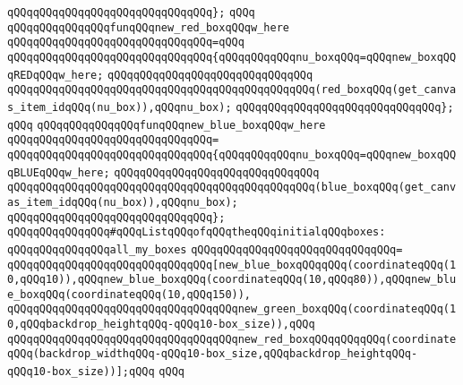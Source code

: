 \verb|qQQqqQQqqQQqqQQqqQQqqQQqqQQqqQQq};|\newline
\verb|qQQq|\newline
\verb|qQQqqQQqqQQqqQQqfunqQQqnew_red_boxqQQqw_here|\newline
\verb|qQQqqQQqqQQqqQQqqQQqqQQqqQQqqQQq=qQQq|\newline
\verb|qQQqqQQqqQQqqQQqqQQqqQQqqQQqqQQq{qQQqqQQqqQQqnu_boxqQQq=qQQqnew_boxqQQqREDqQQqw_here;|\newline
\verb|qQQqqQQqqQQqqQQqqQQqqQQqqQQqqQQq|\newline
\verb|qQQqqQQqqQQqqQQqqQQqqQQqqQQqqQQqqQQqqQQqqQQqqQQq(red_boxqQQq(get_canvas_item_idqQQq(nu_box)),qQQqnu_box);|\newline
\verb|qQQqqQQqqQQqqQQqqQQqqQQqqQQqqQQq};|\newline
\verb|qQQq|\newline
\verb|qQQqqQQqqQQqqQQqfunqQQqnew_blue_boxqQQqw_here|\newline
\verb|qQQqqQQqqQQqqQQqqQQqqQQqqQQqqQQq=|\newline
\verb|qQQqqQQqqQQqqQQqqQQqqQQqqQQqqQQq{qQQqqQQqqQQqnu_boxqQQq=qQQqnew_boxqQQqBLUEqQQqw_here;|\newline
\verb|qQQqqQQqqQQqqQQqqQQqqQQqqQQqqQQq|\newline
\verb|qQQqqQQqqQQqqQQqqQQqqQQqqQQqqQQqqQQqqQQqqQQqqQQq(blue_boxqQQq(get_canvas_item_idqQQq(nu_box)),qQQqnu_box);|\newline
\verb|qQQqqQQqqQQqqQQqqQQqqQQqqQQqqQQq};|\newline
\newline
\verb|qQQqqQQqqQQqqQQq#qQQqListqQQqofqQQqtheqQQqinitialqQQqboxes:|\newline
\newline
\verb|qQQqqQQqqQQqqQQqall_my_boxes|\newline
\verb|qQQqqQQqqQQqqQQqqQQqqQQqqQQqqQQq=|\newline
\verb|qQQqqQQqqQQqqQQqqQQqqQQqqQQqqQQq[new_blue_boxqQQqqQQq(coordinateqQQq(10,qQQq10)),qQQqnew_blue_boxqQQq(coordinateqQQq(10,qQQq80)),qQQqnew_blue_boxqQQq(coordinateqQQq(10,qQQq150)),|\newline
\verb|qQQqqQQqqQQqqQQqqQQqqQQqqQQqqQQqqQQqnew_green_boxqQQq(coordinateqQQq(10,qQQqbackdrop_heightqQQq-qQQq10-box_size)),qQQq|\newline
\verb|qQQqqQQqqQQqqQQqqQQqqQQqqQQqqQQqqQQqnew_red_boxqQQqqQQqqQQq(coordinateqQQq(backdrop_widthqQQq-qQQq10-box_size,qQQqbackdrop_heightqQQq-qQQq10-box_size))];qQQq|\newline
\verb|qQQq|\newline
